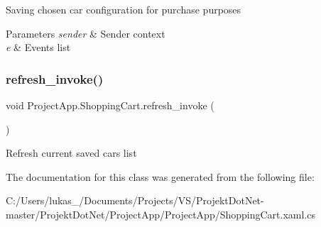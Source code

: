 Saving chosen car configuration for purchase purposes 


\begin{DoxyParams}{Parameters}
{\em sender} & Sender context\\
\hline
{\em e} & Events list\\
\hline
\end{DoxyParams}
\mbox{\label{class_project_app_1_1_shopping_cart_a6041aa28dc90fba4aa37f503fb98a948}} 
\subsubsection{\texorpdfstring{refresh\+\_\+invoke()}{refresh\_invoke()}}
{\footnotesize\ttfamily void Project\+App.\+Shopping\+Cart.\+refresh\+\_\+invoke (\begin{DoxyParamCaption}{ }\end{DoxyParamCaption})}



Refresh current saved cars list 



The documentation for this class was generated from the following file\+:\begin{DoxyCompactItemize}
\item 
C\+:/\+Users/lukas\+\_/\+Documents/\+Projects/\+V\+S/\+Projekt\+Dot\+Net-\/master/\+Projekt\+Dot\+Net/\+Project\+App/\+Project\+App/Shopping\+Cart.\+xaml.\+cs\end{DoxyCompactItemize}
